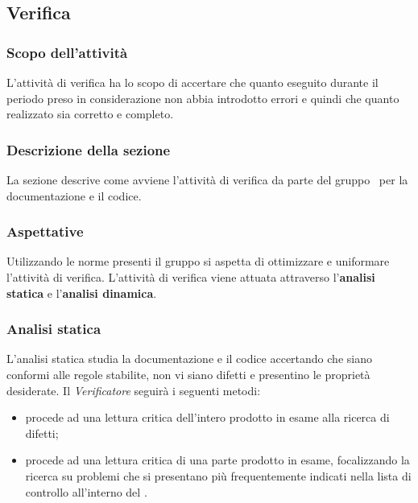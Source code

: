 \subsection{Verifica}\label{Verifica}
\subsubsection{Scopo dell'attività} \label{PSup_Verifica_Scopo}
L'attività di verifica ha lo scopo di accertare che quanto eseguito durante il periodo preso in considerazione non abbia introdotto errori e quindi che quanto realizzato sia corretto e completo.

\subsubsection{Descrizione della sezione} 
La sezione descrive come avviene l'attività di verifica da parte del gruppo \Gruppo\ per la documentazione e il codice.

\subsubsection{Aspettative}
Utilizzando le norme presenti il gruppo si aspetta di ottimizzare e uniformare l'attività di verifica. L'attività di verifica viene attuata attraverso l'\textbf{analisi statica} e l'\textbf{analisi dinamica}.

\subsubsection{Analisi statica}
L'analisi statica studia la documentazione e il codice accertando che siano conformi alle regole stabilite, non vi siano difetti e presentino le proprietà desiderate.
Il \textit{Verificatore} seguirà i seguenti metodi:
\begin{itemize}
	\item {} procede ad una lettura critica dell'intero prodotto in esame alla ricerca di difetti;
	\item {} procede ad una lettura critica di una parte prodotto in esame, focalizzando la ricerca su problemi che si presentano più frequentemente indicati nella lista di controllo all'interno del \PdQ.
\end{itemize}

